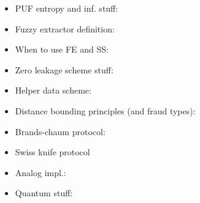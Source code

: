 \documentclass[twocolumn,9pt]{extarticle}
\begin{document}
\begin{itemize}
	\item PUF entropy and inf. stuff:

	\item Fuzzy extractor definition:

	\item When to use FE and SS:

	\item Zero leakage scheme stuff:

	\item Helper data scheme:

	\item Distance bounding principles (and fraud types):

	\item Brands-chaum protocol:

	\item Swiss knife protocol

	\item Analog impl.:

	\item Quantum stuff:


\end{itemize}
\end{document}
